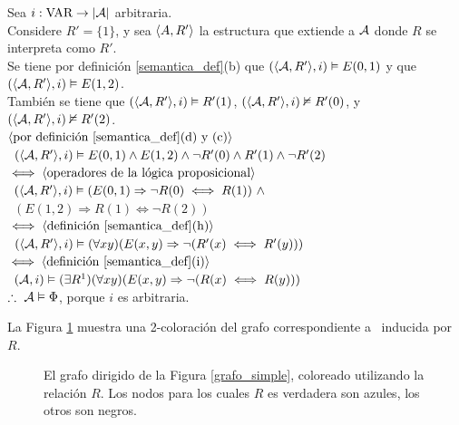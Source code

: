 \begin{enumerate}
Sea $i : \text{VAR} \rightarrow |\mathcal{A}|$ arbitraria.\\
Considere $R' = \{1\}$, y sea $\langle A, R' \rangle$ la estructura que extiende a $\mathcal{A}$
donde $R$ se interpreta como $R'$.\\
Se tiene por definición \ref{semantica_def}(b) que $(\langle \mathcal{A}, R' \rangle,i) 
\vDash E(0,1)$ y que \mbox{$(\langle \mathcal{A}, R' \rangle,i) \vDash E(1,2)$}.\\
También se tiene que $(\langle \mathcal{A}, R' \rangle, i) \vDash R'(1)$, 
$(\langle \mathcal{A}, R' \rangle, i) \nvDash R'(0)$, y $(\langle \mathcal{A}, R' \rangle, i) \nvDash R'(2)$.\\
$\langle \text{por definición \ref{semantica_def}(d) y (c)} \rangle$\\
\mbox{\hspace{5mm} $(\langle \mathcal{A}, R' \rangle, i) \vDash E(0,1) \land E(1,2) \land \neg
R'(0) \land R'(1) \land \neg R'(2)$}\\
$\iff \langle \text{operadores de la lógica proposicional} \rangle$\\
\mbox{\hspace{5mm} $(\langle \mathcal{A}, R' \rangle, i) \vDash (E(0,1) \Rightarrow \neg R(0)
\iff R(1))\ \land$} \\ 
\mbox{\hspace{30mm} $(E(1,2) \Rightarrow R(1) \iff \neg R(2))$}\\
$\iff \langle \text{definición \ref{semantica_def}(h)} \rangle$\\
\mbox{\hspace{5mm} $(\langle \mathcal{A}, R' \rangle, i) 
\vDash (\forall xy)(E(x, y) \Rightarrow \neg(R'(x) \iff R'(y)))$}\\
$\iff \langle \text{definición \ref{semantica_def}(i)} \rangle$\\
\mbox{\hspace{5mm} $(\mathcal{A}, i) 
\vDash (\exists R^1)(\forall xy)(E(x, y) \Rightarrow \neg(R(x) \iff R(y)))$}\\
$\therefore\ \mathcal{A} \vDash \Phi$, porque $i$ es arbitraria.
\end{enumerate}

La Figura \ref{grafo_coloreado} muestra una 2-coloración del grafo correspondiente a \A
\ inducida por $R$.

\begin{figure}[h]
\begin{center}
\end{center}
\caption[Grafo dirigido coloreado por una relación]{El grafo dirigido de la Figura \ref{grafo_simple}, coloreado
utilizando la relación $R$. Los nodos para los cuales $R$ es verdadera son
azules, los otros son negros.}
\label{grafo_coloreado}
\end{figure}

